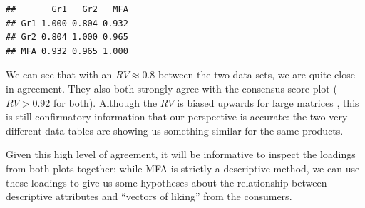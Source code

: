 \documentclass[
]{book}
\newenvironment{Shaded}{\begin{snugshade}}{\end{snugshade}}
\newcommand{\DecValTok}[1]{\textcolor[rgb]{0.00,0.00,0.81}{#1}}
\newcommand{\FunctionTok}[1]{\textcolor[rgb]{0.13,0.29,0.53}{\textbf{#1}}}
\newcommand{\NormalTok}[1]{#1}
\newcommand{\SpecialCharTok}[1]{\textcolor[rgb]{0.81,0.36,0.00}{\textbf{#1}}}
\begin{document}
\begin{Shaded}
\end{Shaded}

\begin{verbatim}
##       Gr1   Gr2   MFA
## Gr1 1.000 0.804 0.932
## Gr2 0.804 1.000 0.965
## MFA 0.932 0.965 1.000
\end{verbatim}

We can see that with an \(RV\approx0.8\) between the two data sets, we are quite close in agreement. They also both strongly agree with the consensus score plot (\(RV>0.92\) for both). Although the \(RV\) is biased upwards for large matrices \citep[see][]{josseMeasuring2016}, this is still confirmatory information that our perspective is accurate: the two very different data tables are showing us something similar for the same products.

Given this high level of agreement, it will be informative to inspect the loadings from both plots together: while MFA is strictly a descriptive method, we can use these loadings to give us some hypotheses about the relationship between descriptive attributes and ``vectors of liking'' from the consumers.
\end{document}
